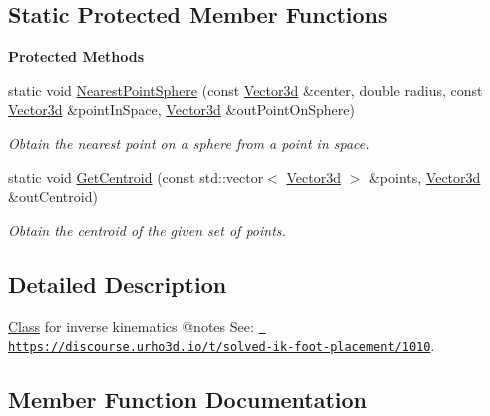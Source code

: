 \subsection*{Static Protected Member Functions}
\begin{Indent}\textbf{ Protected Methods}\par
\begin{DoxyCompactItemize}
\item 
static void \mbox{\hyperlink{classrev_1_1_i_k_ab3f0b66551237bee71819a57e5991075}{Nearest\+Point\+Sphere}} (const \mbox{\hyperlink{classrev_1_1_vector}{Vector3d}} \&center, double radius, const \mbox{\hyperlink{classrev_1_1_vector}{Vector3d}} \&point\+In\+Space, \mbox{\hyperlink{classrev_1_1_vector}{Vector3d}} \&out\+Point\+On\+Sphere)
\begin{DoxyCompactList}\small\item\em Obtain the nearest point on a sphere from a point in space. \end{DoxyCompactList}\item 
\mbox{\label{classrev_1_1_i_k_a2dabde9da7f7e59de49ecd4e8be8182e}} 
static void \mbox{\hyperlink{classrev_1_1_i_k_a2dabde9da7f7e59de49ecd4e8be8182e}{Get\+Centroid}} (const std\+::vector$<$ \mbox{\hyperlink{classrev_1_1_vector}{Vector3d}} $>$ \&points, \mbox{\hyperlink{classrev_1_1_vector}{Vector3d}} \&out\+Centroid)
\begin{DoxyCompactList}\small\item\em Obtain the centroid of the given set of points. \end{DoxyCompactList}\end{DoxyCompactItemize}
\end{Indent}


\subsection{Detailed Description}
\mbox{\hyperlink{struct_class}{Class}} for inverse kinematics @notes See\+: \href{https://discourse.urho3d.io/t/solved-ik-foot-placement/1010}{\texttt{ https\+://discourse.\+urho3d.\+io/t/solved-\/ik-\/foot-\/placement/1010}}. 

\subsection{Member Function Documentation}
\mbox{\label{classrev_1_1_i_k_ab3f0b66551237bee71819a57e5991075}} 
